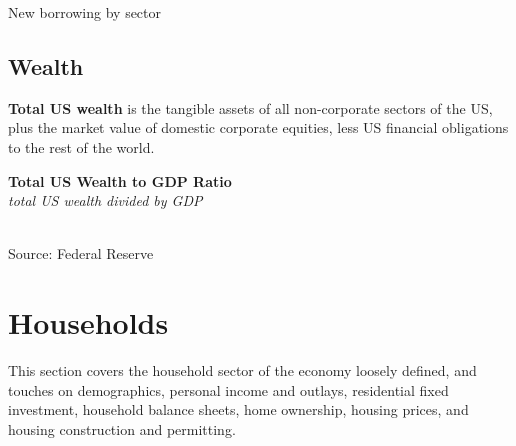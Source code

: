 \documentclass{report}
\makeatletter
\newcommand*\short[1]{\expandafter\@gobbletwo\number\numexpr#1\relax}
\newcommand{\sbar}[4]{
		\addplot[ybar stacked, bar width=2.7pt, draw opacity=0, fill=#1] 
			table [x=#2, y=#3, col sep=comma]{#4};}
\newcommand{\dateaxisticks}{
		date coordinates in=x, axis line style={draw=none},
		xmax={2019-10-01},
		max space between ticks=40,	    
		xtick={{1990-01-01}, {1992-01-01}, {1994-01-01}, 
			{1996-01-01}, {1998-01-01}, {2000-01-01}, 
			{2002-01-01}, {2004-01-01}, {2006-01-01},
			{2008-01-01}, {2010-01-01}, {2012-01-01}, {2014-01-01},
		    {2016-01-01}, {2018-01-01}},
		minor xtick={{1989-01-01}, {1991-01-01}, {1993-01-01},
			{1995-01-01}, {1997-01-01}, {1999-01-01}, 
			{2001-01-01}, {2003-01-01}, {2005-01-01}, {2007-01-01},
		    {2009-01-01}, {2011-01-01}, {2013-01-01}, {2015-01-01},
		    {2017-01-01}, {2019-01-01}},
		enlarge y limits={0.04}, enlarge x limits={0.01},
		}
\newcommand{\bbar}[2]{extra #1 ticks = {{#2}}, extra #1 tick labels = ,
		extra #1 tick style = {grid=major, grid style={thick, black!25}},}
\newcommand{\rbars}{
		\fill[color=black!10] (axis cs:{1990-07-01},\pgfkeysvalueof{/pgfplots/ymin}) rectangle 
			(axis cs:{1991-03-01}, \pgfkeysvalueof{/pgfplots/ymax});
		\fill[color=black!10] (axis cs:{2007-12-01},\pgfkeysvalueof{/pgfplots/ymin}) rectangle 
			(axis cs:{2009-07-01}, \pgfkeysvalueof{/pgfplots/ymax});
		\fill[color=black!10] (axis cs:{2001-03-01},\pgfkeysvalueof{/pgfplots/ymin}) rectangle 
			(axis cs:{2001-11-01}, \pgfkeysvalueof{/pgfplots/ymax});}
\makeatother
\begin{document}
{{\begin{minipage}{0.76\textwidth}
New borrowing by sector\\


\subsection*{\color{black!70} \seriffont Wealth}

\small \textbf{Total US wealth} is the tangible assets of all non-corporate sectors of the US, plus the market value of domestic corporate equities, less US financial obligations to the rest of the world. \\

\vspace{2mm}


\noindent \normalsize \textbf{Total US Wealth to GDP Ratio}\\
\footnotesize{\textit{total US wealth divided by GDP}}\\
\noindent \hspace*{-3mm} \\
\footnotesize{Source: Federal Reserve}


\end{minipage}

\newpage
\section*{\color{darkgray}\LARGE \seriffont Households}

\begin{minipage}{0.76\textwidth}

\small This section covers the household sector of the economy loosely defined, and touches on demographics, personal income and outlays, residential fixed investment, household balance sheets, home ownership, housing prices, and housing construction and permitting.

\vspace{2mm}


\end{minipage}}}
\end{document}
